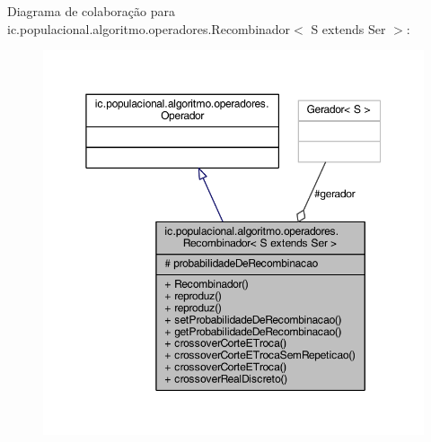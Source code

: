 Diagrama de colaboração para ic.\-populacional.\-algoritmo.\-operadores.\-Recombinador$<$ S extends Ser $>$\-:\nopagebreak
\begin{figure}[H]
\begin{center}
\leavevmode
\includegraphics[width=350pt]{classic_1_1populacional_1_1algoritmo_1_1operadores_1_1_recombinador_3_01_s_01extends_01_ser_01_4__coll__graph}
\end{center}
\end{figure}
